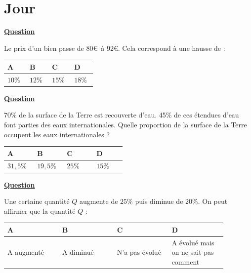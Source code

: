 \documentclass[oneside,12pt]{article}
\let\stdsection\section
\renewcommand{\section}{\stdsection}
\let\oldsection\section
\renewcommand{\section}{\newpage\oldsection}
\begin{document}
\section{Jour }


\underline{\textbf{Question }}

Le prix d'un bien passe de 80\euro\, à 92\euro. Cela correspond à une hausse de :

\begin{center}
	\renewcommand{\arraystretch}{1.35}
	\begin{tabular}{| P{0.22\linewidth} | P{0.22\linewidth} | P{0.22\linewidth} | P{0.22\linewidth} |} \hline
	A & B & C & D \\ \hline
	$10\%$ & $12\%$ & $15\%$ & $18\%$ \\\hline
	\end{tabular}
\end{center}



\underline{\textbf{Question }}

70\% de la surface de la Terre est recouverte d’eau. 45\% de ces étendues d’eau font parties des eaux
internationales. Quelle proportion de la surface de la Terre occupent les eaux internationales ?

\begin{center}
	\renewcommand{\arraystretch}{1.35}
	\begin{tabular}{| P{0.22\linewidth} | P{0.22\linewidth} | P{0.22\linewidth} | P{0.22\linewidth} |} \hline
	A & B & C & D \\ \hline
	$31,5\%$ & $19,5\%$ & $25\%$ & $15\%$ \\\hline
	\end{tabular}
\end{center}



\underline{\textbf{Question }}

Une certaine quantité $Q$ augmente de $25\%$ puis diminue de $20\%$. On peut affirmer que la quantité $Q$ :

\begin{center}
	\renewcommand{\arraystretch}{1.35}
	\begin{tabular}{| P{0.22\linewidth} | P{0.22\linewidth} | P{0.22\linewidth} | P{0.22\linewidth} |} \hline
	A & B & C & D \\ \hline
	\vspace*{-5pt} A augmenté & \vspace*{-5pt} A diminué & \vspace*{-5pt} N'a pas évolué & A évolué mais on ne sait pas comment \\\hline
	\end{tabular}
\end{center}
\end{document}
